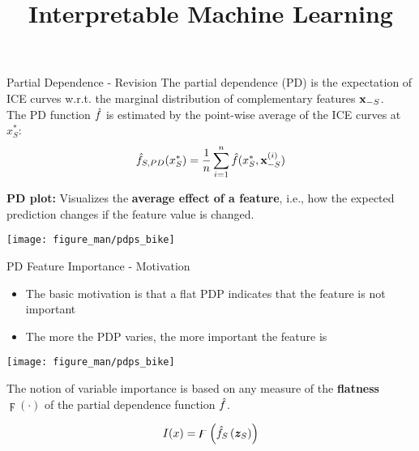 \documentclass[10pt,compress,t,notes=noshow, xcolor=table]{beamer}
\title{Interpretable Machine Learning}
\date{}
\begin{document}


\begin{frame}{Partial Dependence - Revision}
The partial dependence (PD) is the expectation of ICE curves w.r.t. the marginal distribution of complementary features $\mathbf{x}_{-S}$.\\
The PD function $\hat{f}$ is estimated by the point-wise average of the ICE curves at $x_S^*$:
$$\hat{f}_{S, PD}(x_S^*) = \frac{1}{n} \sum_{i=1}^n \hat{f}(x_S^*, \mathbf{x}_{-S}^{(i)})$$



\textbf{PD plot:} Visualizes the \textbf{average effect of a feature},
  i.e., how the expected prediction changes if the feature value is changed.
\begin{center}
\texttt{[image: figure\_man/pdps\_bike]}
\end{center}
\end{frame}

\begin{frame}{PD Feature Importance - Motivation}
\begin{itemize}
    \item The basic motivation is that a flat PDP indicates that the feature is not important
    \item The more the PDP varies, the more important the feature is
\end{itemize}

\begin{center}
\texttt{[image: figure\_man/pdps\_bike]}
\end{center}

The notion of variable importance is based on any measure of the \textbf{flatness} $\digamma(\cdot)$ of the partial dependence function $\hat{f}$.

$$
I(x)=\digamma\left(\hat{f}_{S}\left(\boldsymbol{z}_{S}\right)\right)
$$

\end{frame}
\end{document}
